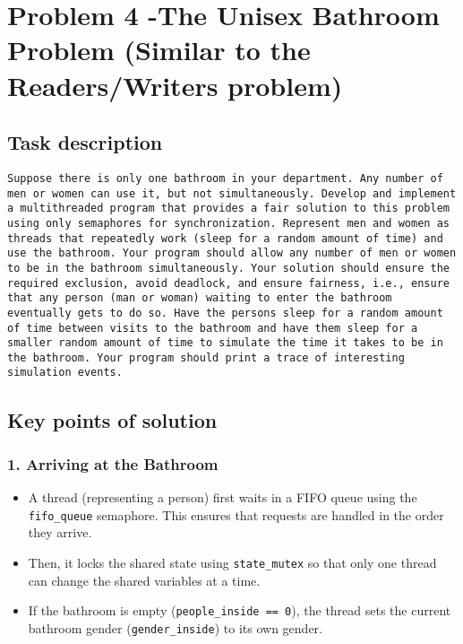 \documentclass[a4paper,11pt]{article}
\begin{document}
\section*{Problem 4 -The Unisex Bathroom Problem (Similar to the Readers/Writers problem)}

\subsection*{Task description}

\begin{verbatim}
Suppose there is only one bathroom in your department. Any number of men or women can use it, but not simultaneously. Develop and implement a multithreaded program that provides a fair solution to this problem using only semaphores for synchronization. Represent men and women as threads that repeatedly work (sleep for a random amount of time) and use the bathroom. Your program should allow any number of men or women to be in the bathroom simultaneously. Your solution should ensure the required exclusion, avoid deadlock, and ensure fairness, i.e., ensure that any person (man or woman) waiting to enter the bathroom eventually gets to do so. Have the persons sleep for a random amount of time between visits to the bathroom and have them sleep for a smaller random amount of time to simulate the time it takes to be in the bathroom. Your program should print a trace of interesting simulation events.
\end{verbatim}

\subsection*{Key points of solution}
\subsubsection*{1. Arriving at the Bathroom}
\begin{itemize}[noitemsep]
    \item A thread (representing a person) first waits in a FIFO queue using the \texttt{fifo\_queue} semaphore. This ensures that requests are handled in the order they arrive.
    \item Then, it locks the shared state using \texttt{state\_mutex} so that only one thread can change the shared variables at a time.
    \item If the bathroom is empty (\texttt{people\_inside == 0}), the thread sets the current bathroom gender (\texttt{gender\_inside}) to its own gender.
\end{itemize}
\end{document}
